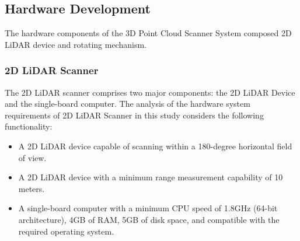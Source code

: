 

\subsection{Hardware Development}
\label{ch3:sec:hardaware_design}
The hardware components of the 3D Point Cloud Scanner System composed 2D LiDAR device and rotating mechanism.

\subsubsection{2D LiDAR Scanner}
The 2D LiDAR scanner comprises two major components: the 2D LiDAR Device and the single-board computer. The analysis of the hardware system requirements of 2D LiDAR Scanner in this study considers the following functionality:

\begin{itemize}
	\item A 2D LiDAR device capable of scanning within a 180-degree horizontal field of view.
	\item A 2D LiDAR device with a minimum range measurement capability of 10 meters.
	\item A single-board computer with a minimum CPU speed of 1.8GHz (64-bit architecture), 4GB of RAM, 5GB of disk space, and compatible with the required operating system.
\end{itemize}

